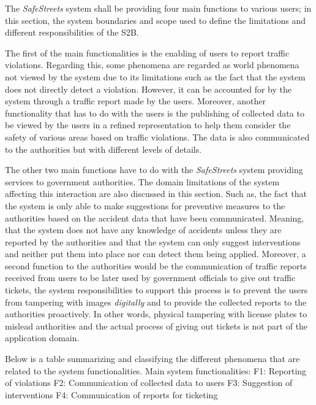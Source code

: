 The \emph{SafeStreets} system shall be providing four main functions to various users; in this section, the system boundaries and scope used to define the limitations and different responsibilities of the S2B. 

The first of the main functionalities is the enabling of users to report traffic violations. Regarding this, some phenomena are regarded as world phenomena not viewed by the system due to its limitations such as the fact that the system does not directly detect a violation. However, it can be accounted for by the system through a traffic report made by the users. Moreover, another functionality that has to do with the users is the publishing of collected data to be viewed by the users in a refined representation to help them consider the safety of various areas based on traffic violations. The data is also communicated to the authorities but with different levels of details.

The other two main functions have to do with the \emph{SafeStreets} system providing services to government authorities. The domain limitations of the system affecting this interaction are also discussed in this section. Such as, the fact that the system is only able to make suggestions for preventive measures to the authorities based on the accident data that have been communicated. Meaning, that the system does not have any knowledge of accidents unless they are reported by the authorities and that the system can only suggest interventions and neither put them into place nor can detect them being applied. Moreover, a second function to the authorities would be the communication of traffic reports received from users to be later used by government officials to give out traffic tickets, the system responsibilities to support this process is to prevent the users from tampering with images \emph{digitally} and to provide the collected reports to the authorities proactively. In other words, physical tampering with license plates to mislead authorities and the actual process of giving out tickets is not part of the application domain. 

Below is a table summarizing and classifying the different phenomena that are related to the system functionalities. 
Main system functionalities:
F1: Reporting of violations
F2: Communication of collected data to users
F3: Suggestion of interventions
F4:  Communication of reports for ticketing


